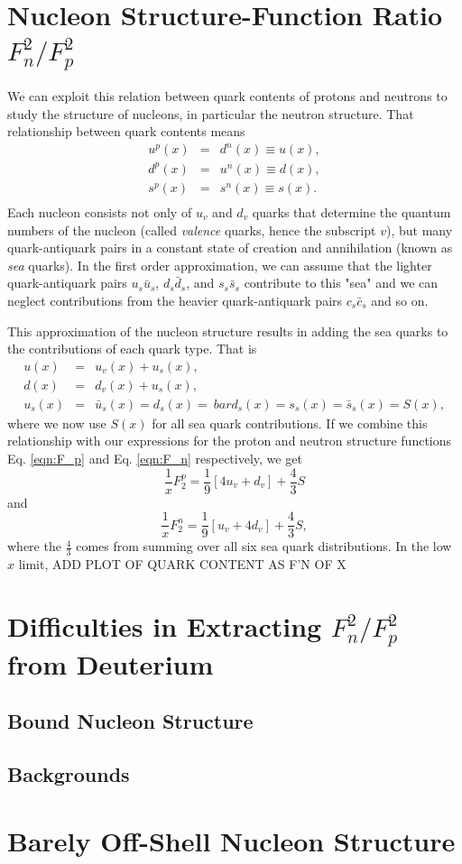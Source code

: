 \section{Nucleon Structure-Function Ratio $F^2_n/F^2_p$}
We can exploit this relation between quark contents of protons and neutrons to study the structure of nucleons, in particular the neutron structure. That relationship between quark contents means
\begin{eqnarray}
\nonumber
u^p(x) &=& d^n(x) \equiv u(x), \\
d^p(x) &=& u^n(x) \equiv d(x), \\
\nonumber
s^p(x) &=& s^n(x) \equiv s(x). \\
\end{eqnarray}
Each nucleon consists not only of $u_v$ and $d_v$ quarks that determine the quantum numbers of the nucleon (called \textit{valence} quarks, hence the subscript $v$), but many quark-antiquark pairs in a constant state of creation and annihilation (known as \textit{sea} quarks). In the first order approximation, we can assume that the lighter quark-antiquark pairs $u_s\bar{u}_s$, $d_s\bar{d}_s$, and $s_s\bar{s}_s$ contribute to this "sea" and we can neglect contributions from the heavier quark-antiquark pairs $c_s\bar{c}_s$ and so on.

This approximation of the nucleon structure results in adding the sea quarks to the contributions of each quark type. That is
\begin{eqnarray}
\nonumber
u(x) &=& u_v(x) + u_s(x), \\
d(x) &=& d_v(x) + u_s(x), \\
u_s(x) &=& \bar{u}_s(x) = d_s(x) = \ bar{d}_s(x) = s_s(x) = \bar{s}_s(x) = S(x),
\end{eqnarray}
where we now use $S(x)$ for all sea quark contributions. If we combine this relationship with our expressions for the proton and neutron structure functions Eq. \ref{eqn:F_p} and Eq. \ref{eqn:F_n} respectively, we get
\begin{equation}
\frac{1}{x} F_2^p = \frac{1}{9}[4u_v + d_v] + \frac{4}{3} S
\end{equation}
and 
\begin{equation}
\frac{1}{x} F_2^n = \frac{1}{9}[u_v + 4d_v] + \frac{4}{3} S,
\end{equation}
where the $\tfrac{4}{3}$ comes from summing over all six sea quark distributions. In the low $x$ limit, ADD PLOT OF QUARK CONTENT AS F'N OF X

\section{Difficulties in Extracting $F^2_n/F^2_p$ from Deuterium}
\subsection{Bound Nucleon Structure}
\subsection{Backgrounds}
\section{Barely Off-Shell Nucleon Structure}
